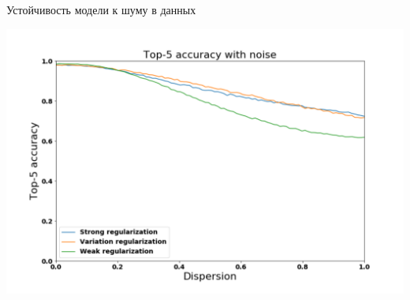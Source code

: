 \documentclass[10pt]{beamer}
\begin{document}
\begin{frame}{Устойчивость модели к шуму в данных}

\centering
\includegraphics[width=1\linewidth]{slides_t5_noise_graph.pdf}
\caption{}
\label{}

\end{frame}
\end{document}
